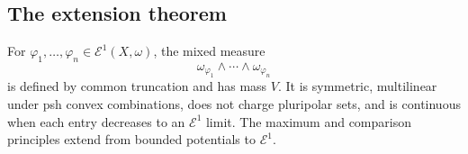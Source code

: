 \subsection{The extension theorem}
\label{sec:ch26-extension-theorem}

\begin{theorem}\label{thm:e1-mixed-products}
For \(\varphi_1,\ldots,\varphi_n\in\mathcal E^1(X,\omega)\), the mixed
measure
\[
       \omega_{\varphi_1}\wedge\cdots\wedge\omega_{\varphi_n}
\]
is defined by common truncation and has mass \(V\). It is symmetric,
multilinear under psh convex combinations, does not charge pluripolar sets,
and is continuous when each entry decreases to an \(\mathcal E^1\) limit.
The maximum and comparison principles extend from bounded potentials to
\(\mathcal E^1\).
\end{theorem}

